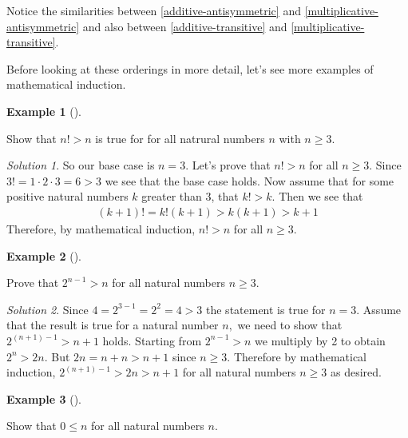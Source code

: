 \documentclass[
  twoside,
  12pt,
  letterpaper]{article}
\theoremstyle{definition}
\theoremstyle{plain}
\theoremstyle{plain}
\theoremstyle{definition}
\newtheorem{example}{Example}[section]
\theoremstyle{definition}
\theoremstyle{remark}
\newtheorem*{solution}{Solution}
\begin{document}
Notice the similarities between \eqref{additive-antisymmetric} and
\eqref{multiplicative-antisymmetric} and also between
\eqref{additive-transitive} and \eqref{multiplicative-transitive}.

Before looking at these orderings in more detail, let's see more
examples of mathematical induction.

\begin{example}[]\protect\hypertarget{exm-factorial}{}\label{exm-factorial}

Show that \(n!>n\) is true for for all natrural numbers \(n\) with
\(n\geq 3\).

\end{example}

\begin{solution}

So our base case is \(n=3\). Let's prove that \(n!>n\) for all
\(n\geq 3\). Since \(3!=1\cdot 2\cdot 3=6>3\) we see that the base case
holds. Now assume that for some positive natural numbers \(k\) greater
than 3, that \(k!>k.\) Then we see that \begin{align*} 
(k+1)! =k!(k+1) >k(k+1) >k+1
\end{align*} Therefore, by mathematical induction, \(n!>n\) for all
\(n\geq 3\).

\end{solution}

\begin{example}[]\protect\hypertarget{exm-exp}{}\label{exm-exp}

Prove that \(2^{n-1} > n\) for all natural numbers \(n\geq 3.\)

\end{example}

\begin{solution}

Since \(4=2^{3-1}=2^2=4>3\) the statement is true for \(n=3.\) Assume
that the result is true for a natural number \(n,\) we need to show that
\(2^{(n+1)-1}>n+1\) holds. Starting from \(2^{n-1}>n\) we multiply by 2
to obtain \(2^n>2n.\) But \(2n=n+n>n+1\) since \(n\geq 3.\) Therefore by
mathematical induction, \(2^{(n+1)-1}>2n>n+1\) for all natural numbers
\(n\geq 3\) as desired.

\end{solution}

\begin{example}[]\protect\hypertarget{exm-zero-is-least}{}\label{exm-zero-is-least}

Show that \(0 \leq n\) for all natural numbers \(n\).

\end{example}
\end{document}
